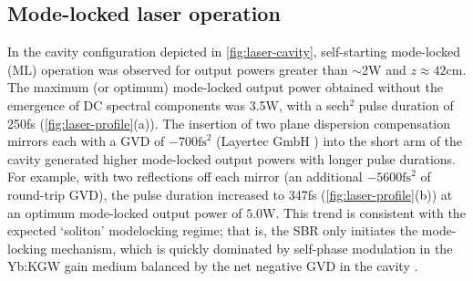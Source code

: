 \subsection{Mode-locked laser operation}

In the cavity configuration depicted in \ref{fig:laser-cavity}, self-starting mode-locked (ML) operation was observed for output powers greater than $\sim$2W and $z \approx 42$cm.
The maximum (or optimum) mode-locked output power obtained without the emergence of DC spectral components was 3.5W, with a sech$^2$ pulse duration of 250fs (\ref{fig:laser-profile}(a)).
The insertion of two plane dispersion compensation mirrors each with a GVD of $-700\text{fs}^2$ (Layertec GmbH \cite{website_layertec}) into the short arm of the cavity generated higher mode-locked output powers with longer pulse durations.
For example, with two reflections off each mirror (an additional $-5600\text{fs}^2$ of round-trip GVD), the pulse duration increased to 347fs (\ref{fig:laser-profile}(b)) at an optimum mode-locked output power of $5.0$W.
This trend is consistent with the expected `soliton' modelocking regime; that is, the SBR only initiates the mode-locking mechanism, which is quickly dominated by self-phase modulation in the Yb:KGW gain medium balanced by the net negative GVD in the cavity \cite{Brunner_diode_pumped}.

